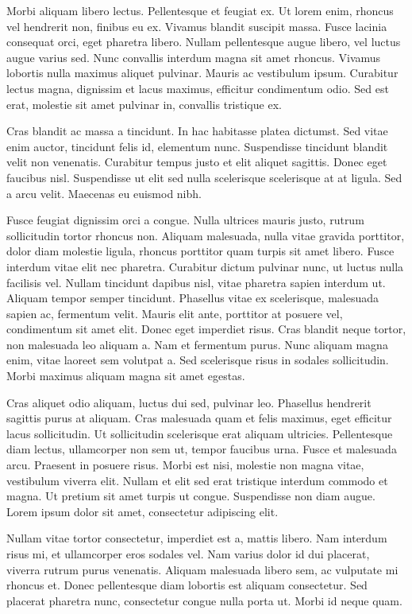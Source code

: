 Morbi aliquam libero lectus. Pellentesque et feugiat ex. Ut lorem enim, rhoncus vel hendrerit non, finibus eu ex. Vivamus blandit suscipit massa. Fusce lacinia consequat orci, eget pharetra libero. Nullam pellentesque augue libero, vel luctus augue varius sed. Nunc convallis interdum magna sit amet rhoncus. Vivamus lobortis nulla maximus aliquet pulvinar. Mauris ac vestibulum ipsum. Curabitur lectus magna, dignissim et lacus maximus, efficitur condimentum odio. Sed est erat, molestie sit amet pulvinar in, convallis tristique ex.

Cras blandit ac massa a tincidunt. In hac habitasse platea dictumst. Sed vitae enim auctor, tincidunt felis id, elementum nunc. Suspendisse tincidunt blandit velit non venenatis. Curabitur tempus justo et elit aliquet sagittis. Donec eget faucibus nisl. Suspendisse ut elit sed nulla scelerisque scelerisque at at ligula. Sed a arcu velit. Maecenas eu euismod nibh.

Fusce feugiat dignissim orci a congue. Nulla ultrices mauris justo, rutrum sollicitudin tortor rhoncus non. Aliquam malesuada, nulla vitae gravida porttitor, dolor diam molestie ligula, rhoncus porttitor quam turpis sit amet libero. Fusce interdum vitae elit nec pharetra. Curabitur dictum pulvinar nunc, ut luctus nulla facilisis vel. Nullam tincidunt dapibus nisl, vitae pharetra sapien interdum ut. Aliquam tempor semper tincidunt. Phasellus vitae ex scelerisque, malesuada sapien ac, fermentum velit. Mauris elit ante, porttitor at posuere vel, condimentum sit amet elit. Donec eget imperdiet risus. Cras blandit neque tortor, non malesuada leo aliquam a. Nam et fermentum purus. Nunc aliquam magna enim, vitae laoreet sem volutpat a. Sed scelerisque risus in sodales sollicitudin. Morbi maximus aliquam magna sit amet egestas.

Cras aliquet odio aliquam, luctus dui sed, pulvinar leo. Phasellus hendrerit sagittis purus at aliquam. Cras malesuada quam et felis maximus, eget efficitur lacus sollicitudin. Ut sollicitudin scelerisque erat aliquam ultricies. Pellentesque diam lectus, ullamcorper non sem ut, tempor faucibus urna. Fusce et malesuada arcu. Praesent in posuere risus. Morbi est nisi, molestie non magna vitae, vestibulum viverra elit. Nullam et elit sed erat tristique interdum commodo et magna. Ut pretium sit amet turpis ut congue. Suspendisse non diam augue. Lorem ipsum dolor sit amet, consectetur adipiscing elit.

Nullam vitae tortor consectetur, imperdiet est a, mattis libero. Nam interdum risus mi, et ullamcorper eros sodales vel. Nam varius dolor id dui placerat, viverra rutrum purus venenatis. Aliquam malesuada libero sem, ac vulputate mi rhoncus et. Donec pellentesque diam lobortis est aliquam consectetur. Sed placerat pharetra nunc, consectetur congue nulla porta ut. Morbi id neque quam.

